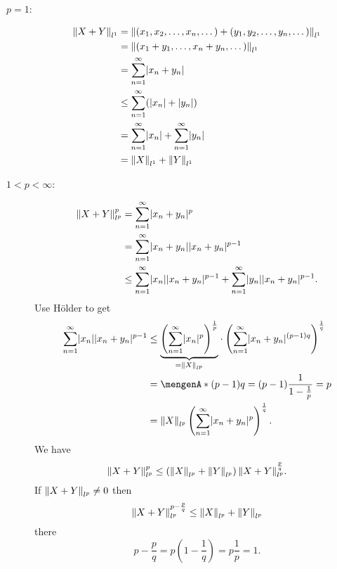\begin{beweis}
	\begin{description}
		\item[$p=1$:] 
		\begin{align*}
			\norm{X+Y}_{l^1} &= \norm{(x_1,x_2, \dots,x_n, \dots)+ (y_1,y_2, \dots,y_n, \dots)}_{l^1} \\
			&= \norm{(x_1+y_1, \dots,x_n + y_n, \dots)}_{l^1} \\
			&= \sum_{n=1}^{\infty} \abs{x_n+y_n} \\
			&\leq \sum_{n=1}^{\infty} (\abs{x_n}+\abs{y_n}) \\
			&= \sum_{n=1}^{\infty}\abs{x_n}+ \sum_{n=1}^{\infty}\abs{y_n} \\
			&= \norm{X}_{l^1}+ \norm{Y}_{l^1}
		\end{align*} 
		\item[$1 < p < \infty$:] 
		\begin{align*}
					\norm{X+Y}_{l^p}^p &= \sum_{n=1}^{\infty}\abs{x_n+y_n}^p \\
					&= \sum_{n=1}^{\infty}\abs{x_n+y_n}\abs{x_n+y_n}^{p-1} \\
					&\leq \sum_{n=1}^{\infty}\abs{x_n}\abs{x_n+y_n}^{p-1} + \sum_{n=1}^{\infty}\abs{y_n}\abs{x_n+y_n}^{p-1}.
		\end{align*}
		Use Hölder to get
		\begin{align*}
			\sum_{n=1}^{\infty}\abs{x_n}\abs{x_n+y_n}^{p-1} &\leq
			 \underset{=\norm{X}_{l^p}}{\underbrace{\left( \sum_{n=1}^{\infty}\abs{x_n}^p \right)^{\frac{1}{p}}}} \cdot \left( \sum_{n=1}^{\infty}\abs{x_n+y_n}^{(p-1)q} \right)^{\frac{1}{q}} \\
			 &= \set{(p-1)q = (p-1)\frac{1}{1-\frac{1}{p}}=p} \\
			 &= \norm{X}_{l^p}  \left( \sum_{n=1}^{\infty}\abs{x_n+y_n}^p \right)^{\frac{1}{q}}.
		\end{align*}
		We have
		\[
			\norm{X+Y}_{l^p}^p \leq \left( \norm{X}_{l^p} + \norm{Y}_{l^p} \right) \norm{X+Y}_{l^p}^{\frac{p}{q}}.
		\]
		If $\norm{X+Y}_{l^p} \neq 0$ then
		\[
			\norm{X+Y}_{l^p}^{p-\frac{p}{q}} \leq \norm{X}_{l^p} + \norm{Y}_{l^p}
		\]
		there
		\[
			p- \frac{p}{q} = p (1- \frac{1}{q}) = p \frac{1}{p} = 1.
		\]
	\end{description}
\end{beweis}
